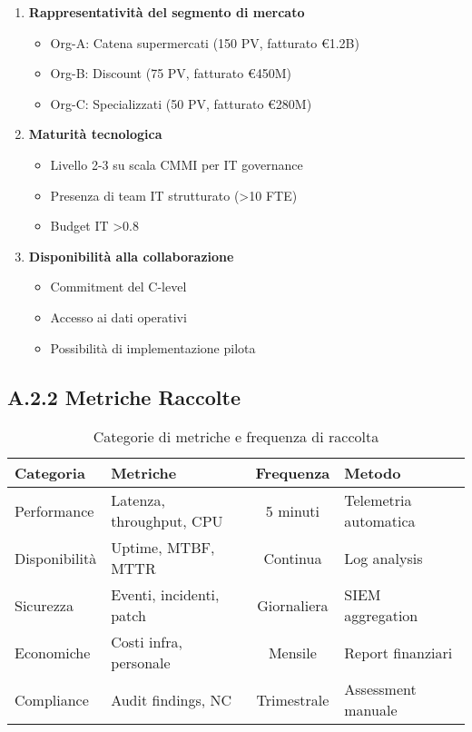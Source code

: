 \begin{enumerate}
    \item \textbf{Rappresentatività del segmento di mercato}
    \begin{itemize}
        \item Org-A: Catena supermercati (150 PV, fatturato €1.2B)
        \item Org-B: Discount (75 PV, fatturato €450M)
        \item Org-C: Specializzati (50 PV, fatturato €280M)
    \end{itemize}
    
    \item \textbf{Maturità tecnologica}
    \begin{itemize}
        \item Livello 2-3 su scala CMMI per IT governance
        \item Presenza di team IT strutturato (>10 FTE)
        \item Budget IT >0.8%
    \end{itemize}
    
    \item \textbf{Disponibilità alla collaborazione}
    \begin{itemize}
        \item Commitment del C-level
        \item Accesso ai dati operativi
        \item Possibilità di implementazione pilota
    \end{itemize}
\end{enumerate}

\subsection{A.2.2 Metriche Raccolte}

\begin{table}[htbp]
\centering
\caption{Categorie di metriche e frequenza di raccolta}
\begin{tabular}{|l|l|c|l|}
\hline
\textbf{Categoria} & \textbf{Metriche} & \textbf{Frequenza} & \textbf{Metodo} \\
\hline
Performance & Latenza, throughput, CPU & 5 minuti & Telemetria automatica \\
Disponibilità & Uptime, MTBF, MTTR & Continua & Log analysis \\
Sicurezza & Eventi, incidenti, patch & Giornaliera & SIEM aggregation \\
Economiche & Costi infra, personale & Mensile & Report finanziari \\
Compliance & Audit findings, NC & Trimestrale & Assessment manuale \\
\hline
\end{tabular}
\end{table}

